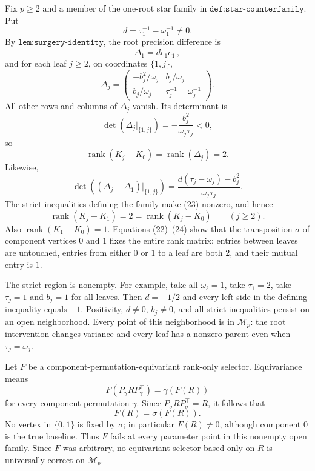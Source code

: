 Fix \(p\ge2\) and a member of the one-root star family in
\(\texttt{def:star-counterfamily}\).  Put
\[
 d=\tau_1^{-1}-\omega_1^{-1}\neq0.
\]
By \(\texttt{lem:surgery-identity}\), the root precision difference is
\[
 \Delta_1=d e_1e_1^{\top},
\]
and for each leaf \(j\ge2\), on coordinates \(\{1,j\}\),
\[
 \Delta_j=
 \begin{pmatrix}
 -b_j^2/\omega_j&b_j/\omega_j\\
 b_j/\omega_j&\tau_j^{-1}-\omega_j^{-1}
 \end{pmatrix}.                                                    \tag{21}
\]
All other rows and columns of \(\Delta_j\) vanish.  Its determinant is
\[
 \det(\Delta_j|_{\{1,j\}})
 =-\frac{b_j^2}{\omega_j\tau_j}<0,
\]
so
\[
 \operatorname{rank}(K_j-K_0)=\operatorname{rank}(\Delta_j)=2.      \tag{22}
\]
Likewise,
\[
 \det((\Delta_j-\Delta_1)|_{\{1,j\}})
 =\frac{d(\tau_j-\omega_j)-b_j^2}{\omega_j\tau_j}.                  \tag{23}
\]
The strict inequalities defining the family make (23) nonzero, and hence
\[
 \operatorname{rank}(K_j-K_1)=2
 =\operatorname{rank}(K_j-K_0) \qquad(j\ge2).                       \tag{24}
\]
Also \(\operatorname{rank}(K_1-K_0)=1\).  Equations (22)--(24) show that
the transposition \(\sigma\) of component vertices \(0\) and \(1\) fixes
the entire rank matrix: entries between leaves are untouched, entries
from either \(0\) or \(1\) to a leaf are both \(2\), and their mutual
entry is \(1\).

The strict region is nonempty.  For example, take all
\(\omega_\ell=1\), take \(\tau_1=2\), take
\(\tau_j=1\) and \(b_j=1\) for all leaves.  Then
\(d=-1/2\) and every left side in the defining inequality equals
\(-1\).  Positivity, \(d\neq0\), \(b_j\neq0\), and all strict
inequalities persist on an open neighborhood.  Every point of this
neighborhood is in \(\mathcal M_p\): the root intervention changes
variance and every leaf has a nonzero parent even when
\(\tau_j=\omega_j\).

Let \(F\) be a component-permutation-equivariant rank-only selector.
Equivariance means
\[
 F(P_\gamma R P_\gamma^{\top})=\gamma(F(R))
\]
for every component permutation \(\gamma\).  Since
\(P_\sigma R P_\sigma^{\top}=R\), it follows that
\[
 F(R)=\sigma(F(R)).
\]
No vertex in \(\{0,1\}\) is fixed by \(\sigma\); in particular
\(F(R)\neq0\), although component \(0\) is the true baseline.  Thus \(F\)
fails at every parameter point in this nonempty open family.  Since \(F\)
was arbitrary, no equivariant selector based only on \(R\) is universally
correct on \(\mathcal M_p\).

